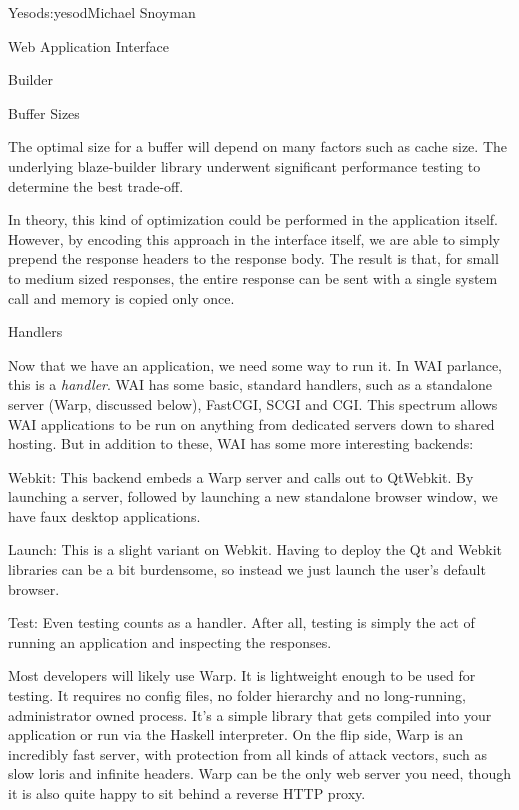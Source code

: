 \begin{aosachapter}{Yesod}{s:yesod}{Michael Snoyman}
\begin{aosasect1}{Web Application Interface}
\begin{aosasect2}{Builder}
\begin{aosabox}{Buffer Sizes}

The optimal size for a buffer will depend on many factors such as
cache size. The underlying blaze-builder library underwent significant
performance testing to determine the best trade-off.

\end{aosabox}

In theory, this kind of optimization could be performed in the
application itself. However, by encoding this approach in the
interface itself, we are able to simply prepend the response headers
to the response body. The result is that, for small to medium sized
responses, the entire response can be sent with a single system call
and memory is copied only once.

\end{aosasect2}

\begin{aosasect2}{Handlers}

Now that we have an application, we need some way to run it. In WAI
parlance, this is a \emph{handler}. WAI has some basic, standard
handlers, such as a standalone server (Warp, discussed below),
FastCGI, SCGI and CGI. This spectrum allows WAI applications to be run
on anything from dedicated servers down to shared hosting. But in
addition to these, WAI has some more interesting backends:

\begin{aosadescription}
  
\item{Webkit:} This backend embeds a Warp server and calls out to
  QtWebkit. By launching a server, followed by launching a new
  standalone browser window, we have faux desktop applications.

\item{Launch:} This is a slight variant on Webkit. Having to deploy
  the Qt and Webkit libraries can be a bit burdensome, so instead we
  just launch the user's default browser.

\item{Test:} Even testing counts as a handler. After all, testing is
  simply the act of running an application and inspecting the
  responses.

\end{aosadescription}

Most developers will likely use Warp. It is lightweight enough to be
used for testing. It requires no config files, no folder hierarchy and
no long-running, administrator owned process. It's a simple library
that gets compiled into your application or run via the Haskell
interpreter. On the flip side, Warp is an incredibly fast server, with
protection from all kinds of attack vectors, such as slow loris and
infinite headers. Warp can be the only web server you need, though it
is also quite happy to sit behind a reverse HTTP proxy.


\end{aosasect2}
\end{aosasect1}
\end{aosachapter}
